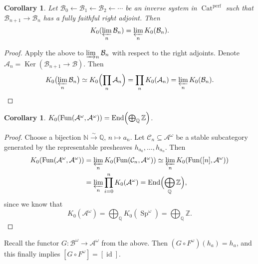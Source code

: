 \documentclass[draft]{amsart}
\newcommand{\NN}{\mathbb{N}}
\newcommand{\ZZ}{\mathbb{Z}}
\newcommand{\QQ}{\mathbb{Q}}
\newcommand{\cat}[1]{\mathcal{#1}}
\newcommand{\from}{\leftarrow}
\newcommand{\isoto}{\mathbin{\xrightarrow{\sim}}}
\DeclareMathOperator{\End}{End}
\DeclareMathOperator{\Cat}{Cat}
\DeclareMathOperator{\Sp}{Sp}
\DeclareMathOperator{\Fun}{Fun}
\DeclareMathOperator{\id}{id}
\DeclareMathOperator{\Ker}{Ker}
\newtheorem{cor}[thm]{Corollary}
\theoremstyle{definition}
\begin{document}
\begin{cor}
Let $\cat B_0\from \cat B_1 \from \cat B_2 \from \dotsb$ be an inverse system in $\Cat^{\mathrm{perf}}$ such that $\cat B_{n+1} \to \cat B_n$ has a fully faithful right adjoint. Then 
\[
K_0(\varprojlim_n \cat B_n) = \varprojlim_n K_0(\cat B_n).
\]
\end{cor}
\begin{proof}
Apply the above to $\varinjlim_n\cat B_n$ with respect to the right adjoints. Denote $\cat A_n = \Ker(\cat B_{n+1} \to \cat B)$. Then
\[
K_0\bigl(\varprojlim_n \cat B_n\bigr) \simeq K_0\Bigl(\prod_n\cat A_n\Bigr) = \prod_n K_0(\cat A_n) = \varprojlim_n K_0(\cat B_n).
\]
\end{proof}

\begin{cor}
$K_0(\Fun(\cat A^\omega, \cat A^\omega)) = \End\Bigl(\bigoplus_{\QQ}\ZZ\Bigr)$.
\end{cor}
\begin{proof}
Choose a bijection $\NN \isoto \QQ$, $n\mapsto a_n$. Let $\cat C_n \subseteq \cat A^\omega$ be a stable subcategory generated by the representable presheaves $h_{a_0},\dotsc,h_{a_n}$. Then
\begin{align*}
K_0(\Fun(\cat A^\omega, \cat A^\omega)) &= \varprojlim_n K_0(\Fun(\cat C_n, \cat A^\omega)) \simeq \varprojlim_n K_0(\Fun([n], \cat A^\omega)) \\
&= \varprojlim_n \prod_{i=0}^n K_0(\cat A^\omega) = \End\Bigl(\bigoplus_{\QQ}\ZZ \Bigr),
\end{align*}
since we know that
\[
K_0(\cat A^\omega) = \bigoplus_{\QQ} K_0(\Sp^\omega) = \bigoplus_{\QQ}\ZZ.
\]
\end{proof}

Recall the functor $G\colon \cat B^\omega \to \cat A^\omega$ from the above. Then $(G\circ F^\omega)(h_a) = h_a$, and this finally implies $[G\circ F^\omega] = [\id]$.
\end{document}
